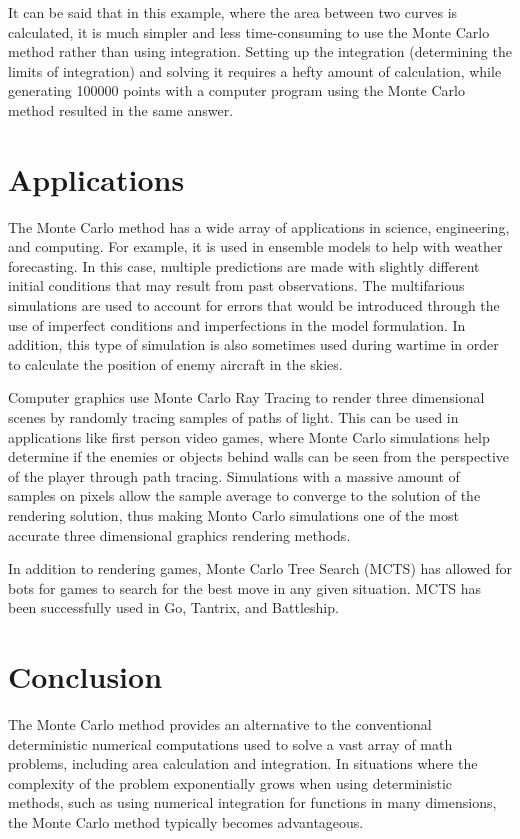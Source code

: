 \documentclass[10pt, letterpaper]{article}
\begin{document}
  It can be said that in this example, where the area between two curves is calculated, it is much simpler and less time-consuming to
  use the Monte Carlo method rather than using integration. Setting up the integration (determining the limits of integration) and
  solving it requires a hefty amount of calculation, while generating 100000 points with a computer program using the Monte Carlo
  method resulted in the same answer.

  \section{Applications}

  The Monte Carlo method has a wide array of applications in science, engineering, and computing. For example, it is used in ensemble models to
  help with weather forecasting. In this case, multiple predictions are made with slightly different initial conditions that may result from
  past observations. The multifarious simulations are used to account for errors that would be introduced through the use of imperfect conditions
  and imperfections in the model formulation. In addition, this type of simulation is also sometimes used during wartime in order to calculate
  the position of enemy aircraft in the skies.

  Computer graphics use Monte Carlo Ray Tracing to render three dimensional scenes by randomly tracing samples of paths of light. This can be
  used in applications like first person video games, where Monte Carlo simulations help determine if the enemies or objects behind walls
  can be seen from the perspective of the player through path tracing. Simulations with a massive amount of samples on pixels allow the sample
  average to converge to the solution of the rendering solution, thus making Monto Carlo simulations one of the most accurate three
  dimensional graphics rendering methods.

  In addition to rendering games, Monte Carlo Tree Search (MCTS) has allowed for bots for games to search for the best move in
  any given situation. MCTS has been successfully used in Go, Tantrix, and Battleship.

  \section{Conclusion}

  The Monte Carlo method provides an alternative to the conventional deterministic numerical computations used to solve a vast array of
  math problems, including area calculation and integration. In situations where the complexity of the problem exponentially grows when
  using deterministic methods, such as using numerical integration for functions in many dimensions, the Monte Carlo method typically
  becomes advantageous.
\end{document}
